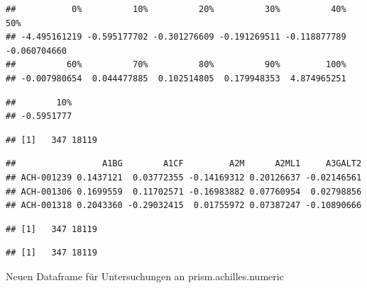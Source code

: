 \documentclass[
]{article}
\begin{document}
\begin{verbatim}
##           0%          10%          20%          30%          40%          50% 
## -4.495161219 -0.595177702 -0.301276609 -0.191269511 -0.118877789 -0.060704660 
##          60%          70%          80%          90%         100% 
## -0.007980654  0.044477885  0.102514805  0.179948353  4.874965251
\end{verbatim}

\begin{verbatim}
##        10% 
## -0.5951777
\end{verbatim}

\begin{verbatim}
## [1]   347 18119
\end{verbatim}

\begin{verbatim}
##                 A1BG        A1CF         A2M      A2ML1     A3GALT2
## ACH-001239 0.1437121  0.03772355 -0.14169312 0.20126637 -0.02146561
## ACH-001306 0.1699559  0.11702571 -0.16983882 0.07760954  0.02798856
## ACH-001318 0.2043360 -0.29032415  0.01755972 0.07387247 -0.10890666
\end{verbatim}

\begin{verbatim}
## [1]   347 18119
\end{verbatim}

\begin{verbatim}
## [1]   347 18119
\end{verbatim}

Neuen Dataframe für Untersuchungen an prism.achilles.numeric
\end{document}
